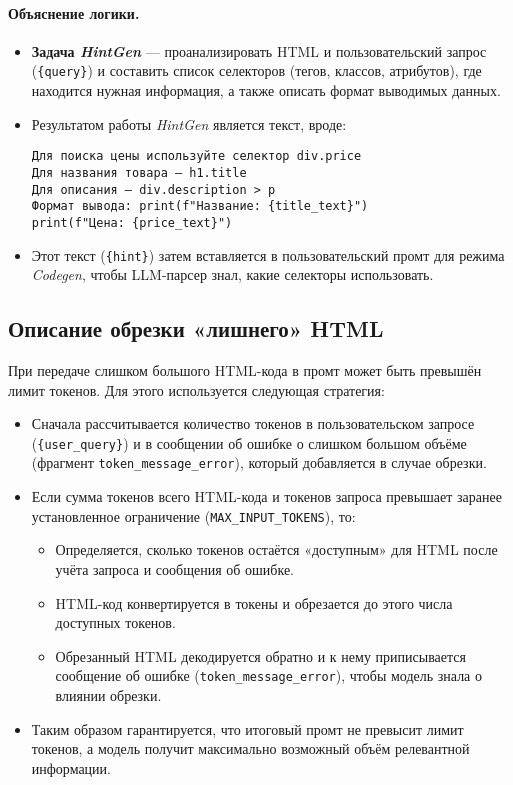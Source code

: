 \paragraph{Объяснение логики.}
\begin{itemize}
\item \textbf{Задача \emph{HintGen}} — проанализировать HTML и пользовательский запрос (\verb|{query}|) и составить список селекторов (тегов, классов, атрибутов), где находится нужная информация, а также описать формат выводимых данных.
\item Результатом работы \emph{HintGen} является текст, вроде:
\begin{verbatim}
Для поиска цены используйте селектор div.price
Для названия товара — h1.title
Для описания — div.description > p
Формат вывода: print(f"Название: {title_text}")
print(f"Цена: {price_text}")
\end{verbatim}
\item Этот текст (\verb|{hint}|) затем вставляется в пользовательский промт для режима \emph{Codegen}, чтобы LLM-парсер знал, какие селекторы использовать.
\end{itemize}

\subsection{Описание обрезки «лишнего» HTML}

При передаче слишком большого HTML-кода в промт может быть превышён лимит токенов. Для этого используется следующая стратегия:
\begin{itemize}
\item Сначала рассчитывается количество токенов в пользовательском запросе (\verb|{user_query}|) и в сообщении об ошибке о слишком большом объёме (фрагмент \verb|token_message_error|), который добавляется в случае обрезки.
\item Если сумма токенов всего HTML-кода и токенов запроса превышает заранее установленное ограничение (\verb|MAX_INPUT_TOKENS|), то:
\begin{itemize}
\item Определяется, сколько токенов остаётся «доступным» для HTML после учёта запроса и сообщения об ошибке.
\item HTML-код конвертируется в токены и обрезается до этого числа доступных токенов.
\item Обрезанный HTML декодируется обратно и к нему приписывается сообщение об ошибке (\verb|token_message_error|), чтобы модель знала о влиянии обрезки.
\end{itemize}
\item Таким образом гарантируется, что итоговый промт не превысит лимит токенов, а модель получит максимально возможный объём релевантной информации.
\end{itemize}

